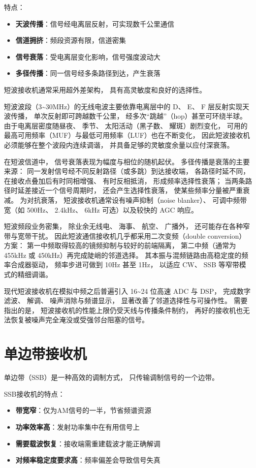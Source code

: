 特点：
\begin{itemize}
    \item \textbf{天波传播}：信号经电离层反射，可实现数千公里通信
    \item \textbf{信道拥挤}：频段资源有限，信道密集
    \item \textbf{信号衰落}：受电离层变化影响，信号强度波动大
    \item \textbf{多径传播}：同一信号经多条路径到达，产生衰落
\end{itemize}

短波接收机通常采用超外差架构，
具有高灵敏度和良好的选择性。

短波波段（3\sim30MHz）的无线电波主要依靠电离层中的 D、
E、
F 层反射实现天波传播，
单次反射即可跨越数千公里，
经多次“跳越”（hop）甚至可环绕半球。
由于电离层密度随昼夜、
季节、
太阳活动（黑子数、
耀斑）剧烈变化，
可用的最高可用频率（MUF）与最低可用频率（LUF）也在不断变化，
因此短波接收机必须能够在整个波段内连续调谐，
并具备足够的灵敏度余量以应付深衰落。

在短波信道中，
信号衰落表现为幅度与相位的随机起伏。
多径传播是衰落的主要来源：
同一发射信号经不同反射路径（或多跳）到达接收端，
各路径时延不同，
在接收点叠加后有时同相增强、
有时反相抵消，
形成频率选择性衰落；
当两条路径时延差接近一个信号周期时，
还会产生选择性衰落，
使某些频率分量被严重衰减。
为对抗衰落，
短波接收机通常设有噪声抑制（noise blanker）、
可调中频带宽（如 500Hz、
2.4kHz、
6kHz 可选）以及较快的 AGC 响应。

短波频段业务密集，
除业余无线电、
海事、
航空、
广播外，
还可能存在各种窄带与宽带干扰。
因此短波通信接收机几乎都采用二次变频（double conversion）方案：
第一中频取得较高的镜频抑制与较好的前端隔离，
第二中频（通常为 455kHz 或 450kHz）再完成陡峭的邻道选择。
其本振与混频链路由高稳定度的频率合成器驱动，
频率步进可做到 10Hz 甚至 1Hz，
以适应 CW、
SSB 等窄带模式的精细调谐。

现代短波接收机在模拟中频之后普遍引入 16\sim24 位高速 ADC 与 DSP，
完成数字滤波、
解调、
噪声消除与频谱显示，
显著改善了邻道选择性与可操作性。
需要指出的是，
短波接收机的性能上限仍受天线与传播条件制约，
再好的接收机也无法恢复被噪声完全淹没或受强邻台阻塞的信号。

\section{单边带接收机}
\label{sec:ssb_receiver}

单边带（SSB）是一种高效的调制方式，
只传输调制信号的一个边带。

SSB接收机的特点：
\begin{itemize}
    \item \textbf{带宽窄}：仅为AM信号的一半，节省频谱资源
    \item \textbf{功率效率高}：发射功率集中在有用信号上
    \item \textbf{需要载波恢复}：接收端需重建载波才能正确解调
    \item \textbf{对频率稳定度要求高}：频率偏差会导致信号失真
\end{itemize}

